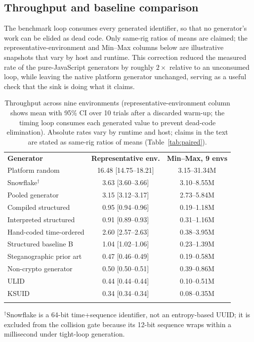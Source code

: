 \documentclass{svproc}
\begin{document}
\subsection{Throughput and baseline comparison}
\label{sec:throughput}

The benchmark loop consumes every generated identifier, so that no generator's work can be elided as dead code. Only same-rig ratios of means are claimed; the representative-environment and Min--Max columns below are illustrative snapshots that vary by host and runtime. This correction reduced the measured rate of the pure-JavaScript generators by roughly $2\times$ relative to an unconsumed loop, while leaving the native platform generator unchanged, serving as a useful check that the sink is doing what it claims.

\begin{table}[!ht]
\caption{Throughput across nine environments (representative-environment column shows mean with 95\% CI over 10 trials after a
discarded warm-up; the timing loop consumes each generated value to
prevent dead-code elimination). Absolute rates vary by runtime and host;
claims in the text are stated as same-rig ratios of means
(Table~\ref{tab:paired}).}
\label{tab:throughput}
\centering\footnotesize
\begin{tabular*}{\columnwidth}{@{\extracolsep{\fill}}lcc}
\hline\noalign{\smallskip}
\textbf{Generator} & \textbf{Representative env.} & \textbf{Min--Max, 9 envs} \\
\noalign{\smallskip}\hline\noalign{\smallskip}
Platform random          & 16.48 [14.75--18.21] & 3.15--31.34M \\
Snowflake$^\dagger$        &  3.63 [3.60--3.66] & 3.10--8.55M \\
Pooled generator           &  3.15 [3.12--3.17] & 2.73--5.84M \\
Compiled structured        &  0.95 [0.94--0.96] & 0.19--1.18M \\
Interpreted structured     &  0.91 [0.89--0.93] & 0.31--1.16M \\
Hand-coded time-ordered    &  2.60 [2.57--2.63] & 0.38--3.95M \\
Structured baseline B      &  1.04 [1.02--1.06] & 0.23--1.39M \\
Steganographic prior art   &  0.47 [0.46--0.49] & 0.19--0.58M \\
Non-crypto generator       &  0.50 [0.50--0.51] & 0.39--0.86M \\
ULID                       &  0.44 [0.44--0.44] & 0.10--0.51M \\
KSUID                      &  0.34 [0.34--0.34] & 0.08--0.35M \\
\noalign{\smallskip}\hline
\end{tabular*}
\smallskip
\footnotesize $^\dagger$Snowflake is a 64-bit time+sequence identifier, not
an entropy-based UUID; it is excluded from the collision gate because its
12-bit sequence wraps within a millisecond under tight-loop generation.
\end{table}
\end{document}
